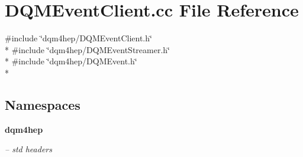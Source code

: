 \section{D\+Q\+M\+Event\+Client.\+cc File Reference}
\label{DQMEventClient_8cc}
{\ttfamily \#include \char`\"{}dqm4hep/\+D\+Q\+M\+Event\+Client.\+h\char`\"{}}\\*
{\ttfamily \#include \char`\"{}dqm4hep/\+D\+Q\+M\+Event\+Streamer.\+h\char`\"{}}\\*
{\ttfamily \#include \char`\"{}dqm4hep/\+D\+Q\+M\+Event.\+h\char`\"{}}\\*
\subsection*{Namespaces}
\begin{DoxyCompactItemize}
\item 
 {\bf dqm4hep}
\begin{DoxyCompactList}\small\item\em -- std headers \end{DoxyCompactList}\end{DoxyCompactItemize}
